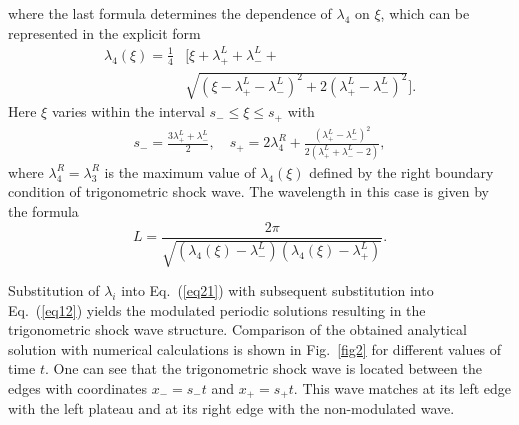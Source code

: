 \documentclass[pre,aps,superscriptaddress,twocolumn,floatfix]{revtex4-1}
\newcommand{\la}{\lambda}
\begin{document}
where the last formula determines the dependence of $\lambda_4$ on $\xi$,
which can be represented in the explicit form
\begin{equation}\label{}
\begin{split}
\la_4(\xi)=\frac14
& \bigg[\xi+\la_+^L+\la_-^L+\\
& \sqrt{(\xi-\la_+^L-\la_-^L)^2+2(\la_+^L-\la_-^L)^2}\bigg].
\end{split}
\end{equation}
Here $\xi$ varies within the interval $s_-\leq \xi\leq s_+$ with
\begin{equation}\label{}
\begin{split}
s_-=\frac{3\la_+^L+\la_-^L}{2},\quad
s_+=2\lambda_4^R+\frac{(\la_+^L-\la_-^L)^2}{2(\la_+^L+\la_-^L-2)},
\end{split}
\end{equation}
where $\la_4^R=\la_3^R$ is the maximum value of $\la_4(\xi)$ defined
by the right boundary condition of trigonometric shock wave.
The wavelength in this case is given by the formula
\begin{equation}\label{}
L=\frac{2\pi}{\sqrt{(\la_4(\xi)-\la_-^L)(\la_4(\xi)-\la_+^L)}}.
\end{equation}

Substitution of $\la_i$ into Eq.~(\ref{eq21}) with subsequent substitution
into Eq.~(\ref{eq12}) yields the modulated periodic solutions resulting
in the trigonometric shock wave structure. Comparison of the obtained analytical
solution with numerical calculations is shown in Fig.~\ref{fig2} for different
values of time $t$.
One can see that the trigonometric shock wave is located between the edges with
coordinates $x_-=s_-t$ and $x_+=s_+t$. This wave matches at its left edge with
the left  plateau and at its right edge with the non-modulated wave.
\end{document}
